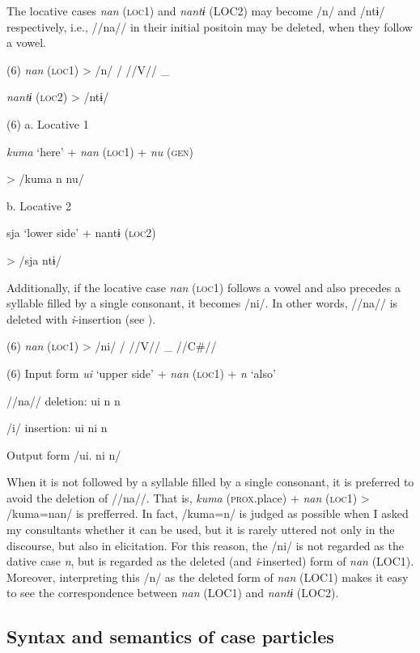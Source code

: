 The locative cases \textit{nan} (\textsc{loc}1) and \textit{nantɨ} (LOC2) may become /n/ and /ntɨ/ respectively, i.e., //na// in their initial positoin may be deleted, when they follow a vowel.

(6)  \textit{nan}  (\textsc{loc}1)  >  %
/n/    /  //V//  \_

  \textit{nantɨ}  (\textsc{loc}2)  >  /ntɨ/

(6)  a.  Locative 1      

    \textit{kuma}  ‘here’  +  \textit{nan}  (\textsc{loc}1)  +  \textit{nu}  (\textsc{gen})

  >  /kuma      n      nu/  

  b.  Locative 2      

    sja  ‘lower side’  +  nantɨ  (\textsc{loc}2)

  >  /sja      ntɨ/        

Additionally, if the locative case \textit{nan} (\textsc{loc}1) follows a vowel and also precedes a syllable filled by a single consonant, it becomes /ni/. In other words, //na// is deleted with \textit{i}{}-insertion (see ).

(6)  \textit{nan}  (\textsc{loc}1)  >  /ni/  /  //V//  \_  //C\#//

(6)  Input form  \textit{ui}  ‘upper side’  +  \textit{nan}  (\textsc{loc}1)  +  \textit{n}  ‘also’

  //na// deletion:  ui      n      n  

  /i/ insertion:  ui      ni      n  

  Output form  /ui.      ni      n/  

When it is not followed by a syllable filled by a single consonant, it is preferred to avoid the deletion of //na//. That is, \textit{kuma} (\textsc{prox}.place) + \textit{nan} (\textsc{loc}1) > /kuma=nan/ is prefferred. In fact, /kuma=n/ is judged as possible when I asked my consultants whether it can be used, but it is rarely uttered not only in the discourse, but also in elicitation. For this reason, the /ni/ is not regarded as the dative case \textit{n}, but is regarded as the deleted (and \textit{i}{}-inserted) form of \textit{nan} (LOC1). Moreover, interpreting this /n/ as the deleted form of \textit{nan} (LOC1) makes it easy to see the correspondence between \textit{nan} (LOC1) and \textit{nantɨ} (LOC2).

\subsection{Syntax and semantics of case particles}

